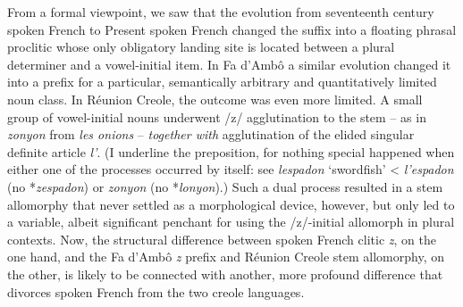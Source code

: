 \documentclass[output=paper]{langscibook}
\begin{document}
From a formal viewpoint, we saw that the evolution from seventeenth century spoken French to Present spoken French changed the suffix into a floating phrasal proclitic whose only obligatory landing site is located between a plural determiner and a vowel-initial item. In Fa d’Ambô a similar evolution changed it into a prefix for a particular, semantically arbitrary and quantitatively limited noun class. In Réunion Creole, the outcome was even more limited. A small group of vowel-initial nouns underwent /z/ agglutination to the stem -- as in \textit{zonyon} from \textit{les onions} -- \textit{together with} agglutination of the elided singular definite article \textit{l’}. (I underline the preposition, for nothing special happened when either one of the processes occurred by itself: see \textit{lespadon} ‘swordfish’ < \textit{l’espadon} (no *\textit{zespadon}) or \textit{zonyon} (no *\textit{lonyon}).) Such a dual process resulted in a stem allomorphy that never settled as a morphological device, however, but only led to a variable, albeit significant penchant for using the /z/-initial allomorph in plural contexts. Now, the structural difference between spoken French clitic \textit{z}, on the one hand, and the Fa d’Ambô \textit{z} prefix and Réunion Creole stem allomorphy, on the other, is likely to be connected with another, more profound difference that divorces spoken French from the two creole languages.
\end{document}
